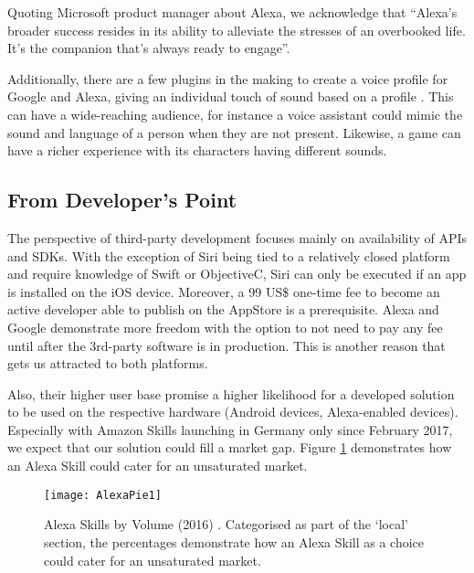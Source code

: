 Quoting Microsoft product manager about Alexa, we acknowledge that ``Alexa’s broader success resides in its ability to alleviate the stresses of an overbooked life. It’s the companion that’s always ready to engage''\cite{darrenAustin}.

Additionally, there are a few plugins in the making to create a voice profile for Google and Alexa, giving an individual touch of sound based on a profile \cite{alexa_19}. This can have a wide-reaching  audience, for instance a voice assistant could mimic the sound and language of a person when they are not present. Likewise, a game can have a richer experience with its characters having different sounds.

%
%	
%	
%	

\subsection*{From Developer's Point}

The perspective of third-party development focuses mainly on availability of APIs and SDKs. With the exception of Siri being tied to a relatively closed platform and require knowledge of Swift or ObjectiveC, Siri can only be executed if an app is installed on the iOS device.
Moreover, a 99 US\$ one-time fee to become an active developer able to publish on the AppStore is a prerequisite. Alexa and Google demonstrate more freedom with the option to not need to pay any fee until after the 3rd-party software is in production. This is another reason that gets us attracted to both platforms.

Also, their higher user base promise a higher likelihood for a developed solution to be used on the respective hardware (Android devices, Alexa-enabled devices).
Especially with Amazon Skills launching in Germany only since February 2017, we expect that our solution could fill a market gap. Figure \ref{skillsbyvol} demonstrates how an Alexa Skill could cater for an unsaturated market.




\begin{figure}[h]
	\caption[Alexa Skills by Volume (2016)]{Alexa Skills by Volume (2016) \cite{voicelabs:trends}. Categorised as part of the `local' section, the percentages demonstrate how an Alexa Skill as a choice could cater for an unsaturated market.}
	\label{skillsbyvol}
	\texttt{[image: AlexaPie1]} 
\end{figure}



